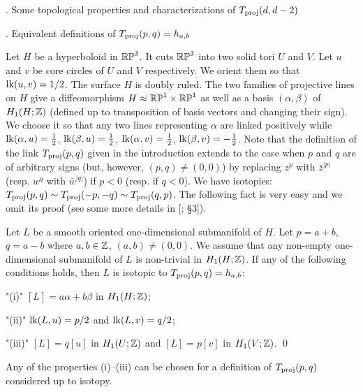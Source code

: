 


\head\sectPermut. Some topological properties and characterizations of $T_{\operatorname{proj}}(d,d-2)$
\endhead

\subhead\sectHabTpq. Equivalent definitions of $T_{\operatorname{proj}}(p,q)=h_{a,b}$
\endsubhead

Let $H$ be a hyperboloid in $\Bbb{RP}^3$. It cuts $\Bbb{RP}^3$ into two solid tori $U$ and $V$.
Let $u$ and $v$ be core circles of $U$ and $V$ respectively. We orient them so that
$\operatorname{lk}(u,v)=1/2$. The surface $H$ is doubly ruled.
The two families of projective lines on $H$ give a diffeomorphism
$H\approx \Bbb{RP}^1\times \Bbb{RP}^1$ as well as a basis $(\alpha,\beta)$ of $H_1(H;\Bbb Z)$ (defined up to transposition
of basis vectors and changing their sign). We choose it so that any two lines representing $\alpha$
are linked positively
while $\operatorname{lk}(\alpha,u)=\frac12$, $\operatorname{lk}(\beta,u)=\frac12$, $\operatorname{lk}(\alpha,v)=\frac12$, $\operatorname{lk}(\beta,v)=-\frac12$.
%
Note that the definition of the link $T_{\operatorname{proj}}(p,q)$ given in the introduction extends
to the case when $p$ and $q$ are of arbitrary signs (but, however, $(p,q)\ne(0,0)$)
by replacing $z^p$ with $\bar z^{|p|}$ (resp. $w^q$ with $\bar w^{|q|}$) if $p<0$ (resp. if $q<0$).
We have isotopies: $T_{\operatorname{proj}}(p,q)\sim T_{\operatorname{proj}}(-p,-q)\sim T_{\operatorname{proj}}(q,p)$. 
The following fact is very easy and we omit its proof (see some more details in [; \S3]).

 Let $L$ be a smooth oriented one-dimensional submanifold of $H$.
Let $p=a+b$, $q=a-b$ where $a,b\in\Bbb Z$, $(a,b)\ne (0,0)$.
We assume that any non-empty one-dimensional submanifold of $L$ is non-trivial in $H_1(H;\Bbb Z)$.
If any of the following conditions holds,
then $L$ is isotopic to $T_{\operatorname{proj}}(p,q)=h_{a,b}$:
%
\roster
\item"(i)"   $[L]=a\alpha+b\beta$ in $H_1(H;\Bbb Z)$;
\item"(ii)"  $\operatorname{lk}(L,u)=p/2$ and $\operatorname{lk}(L,v)=q/2$;
\item"(iii)" $[L]=q[u]$ in $H_1(U;\Bbb Z)$ and $[L]=p[v]$ in $H_1(V;\Bbb Z)$. \qed
\endroster
\endproclaim

Any of the properties (i)--(iii) can be chosen for a definition of $T_{\operatorname{proj}}(p,q)$
considered up to isotopy.

